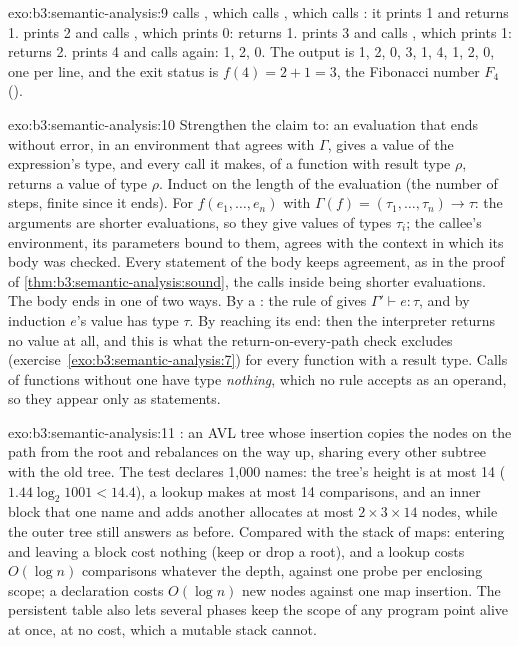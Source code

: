 \begin{solution}{exo:b3:semantic-analysis:9}
 calls , which calls , which calls : it prints 1 and returns 1.  prints 2 and calls , which prints 0:  returns 1.  prints 3 and calls , which prints 1:  returns 2.  prints 4 and calls  again: 1, 2, 0. The output is 1, 2, 0, 3, 1, 4, 1, 2, 0, one per line, and the exit status is $f(4) = 2 + 1 = 3$, the Fibonacci number $F_4$ ().
\end{solution}

\begin{solution}{exo:b3:semantic-analysis:10}
Strengthen the claim to: an evaluation that ends without error, in an environment that agrees with $\Gamma$, gives a value of the expression's type, and every call it makes, of a function with result type $\rho$, returns a value of type $\rho$. Induct on the length of the evaluation (the number of steps, finite since it ends). For $f(e_1, \dots, e_n)$ with $\Gamma(f) = (\tau_1, \dots, \tau_n) \to \tau$: the arguments are shorter evaluations, so they give values of types $\tau_i$; the callee's environment, its parameters bound to them, agrees with the context in which its body was checked. Every statement of the body keeps agreement, as in the proof of \cref{thm:b3:semantic-analysis:sound}, the calls inside being shorter evaluations. The body ends in one of two ways. By a : the rule of  gives $\Gamma' \vdash e : \tau$, and by induction $e$'s value has type $\tau$. By reaching its end: then the interpreter returns no value at all, and this is what the return-on-every-path check excludes (exercise~\ref{exo:b3:semantic-analysis:7}) for every function with a result type. Calls of functions without one have type \emph{nothing}, which no rule accepts as an operand, so they appear only as statements.
\end{solution}

\begin{solution}{exo:b3:semantic-analysis:11}
: an AVL tree whose insertion copies the nodes on the path from the root and rebalances on the way up, sharing every other subtree with the old tree. The test declares 1,000 names: the tree's height is at most 14 ($1.44 \log_2 1001 < 14.4$), a lookup makes at most 14 comparisons, and an inner block that  one name and adds another allocates at most $2 \times 3 \times 14$ nodes, while the outer tree still answers as before. Compared with the stack of maps: entering and leaving a block cost nothing (keep or drop a root), and a lookup costs $O(\log n)$ comparisons whatever the depth, against one probe per enclosing scope; a declaration costs $O(\log n)$ new nodes against one map insertion. The persistent table also lets several phases keep the scope of any program point alive at once, at no cost, which a mutable stack cannot.
\end{solution}

